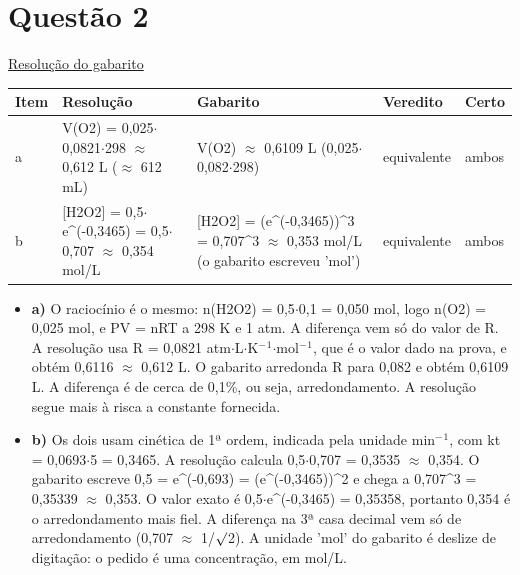 \documentclass{article}%
\begin{document}
\section*{Questão 2}%
\href{https://poliedroresolve.sistemapoliedro.com.br/vestibulares/ita/2026/ita-2-fase-dia-2-29-10-2025-2-fase-dia-2/dissertativa-2-quimica-2-fase-dia-2-ita-2026}{Resolução do gabarito}\par\smallskip%
\begin{longtable}{@{}p{} p{} p{} p{} p{}@{}}\toprule Item & Resolução & Gabarito & Veredito & Certo \\ \midrule
a & V(O2) = 0,025$\cdot$0,0821$\cdot$298 $\approx$ 0,612 L ($\approx$ 612 mL) & V(O2) $\approx$ 0,6109 L (0,025$\cdot$0,082$\cdot$298) & equivalente & ambos \\
b & {[}H2O2{]} = 0,5$\cdot$e\^{}(-0,3465) = 0,5$\cdot$0,707 $\approx$ 0,354 mol/L & {[}H2O2{]} = (e\^{}(-0,3465))\^{}3 = 0,707\^{}3 $\approx$ 0,353 mol/L (o gabarito escreveu 'mol') & equivalente & ambos \\
\bottomrule\end{longtable}%
\begin{itemize}%
\item%
\textbf{a)} O raciocínio é o mesmo: n(H2O2) = 0,5$\cdot$0,1 = 0,050 mol, logo n(O2) = 0,025 mol, e PV = nRT a 298 K e 1 atm. A diferença vem só do valor de R. A resolução usa R = 0,0821 atm$\cdot$L$\cdot$K$^{-}$$^{1}$$\cdot$mol$^{-}$$^{1}$, que é o valor dado na prova, e obtém 0,6116 $\approx$ 0,612 L. O gabarito arredonda R para 0,082 e obtém 0,6109 L. A diferença é de cerca de 0,1\%, ou seja, arredondamento. A resolução segue mais à risca a constante fornecida.%
\item%
\textbf{b)} Os dois usam cinética de 1ª ordem, indicada pela unidade min$^{-}$$^{1}$, com kt = 0,0693$\cdot$5 = 0,3465. A resolução calcula 0,5$\cdot$0,707 = 0,3535 $\approx$ 0,354. O gabarito escreve 0,5 = e\^{}(-0,693) = (e\^{}(-0,3465))\^{}2 e chega a 0,707\^{}3 = 0,35339 $\approx$ 0,353. O valor exato é 0,5$\cdot$e\^{}(-0,3465) = 0,35358, portanto 0,354 é o arredondamento mais fiel. A diferença na 3ª casa decimal vem só de arredondamento (0,707 $\approx$ 1/$\surd$2). A unidade 'mol' do gabarito é deslize de digitação: o pedido é uma concentração, em mol/L.%
\end{itemize}%
\end{document}
